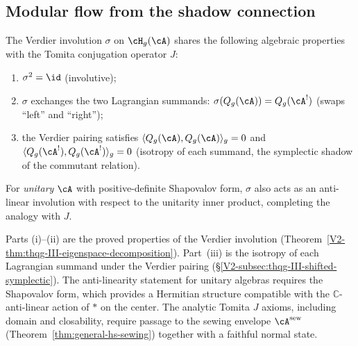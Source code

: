 \subsection{Modular flow from the shadow connection}
\label{subsec:thqg-entanglement-modular-flow}

\begin{conjecture}
\label{conj:thqg-tomita-from-verdier}
The Verdier involution $\sigma$ on $\cH_g(\cA)$
shares the following algebraic properties with the Tomita
conjugation operator $J$:
\begin{enumerate}[label=\textup{(\roman*)}]
\item $\sigma^2 = \id$ \textup{(}involutive\textup{)};
\item $\sigma$ exchanges the two Lagrangian summands:
 $\sigma(Q_g(\cA)) = Q_g(\cA^!)$ \textup{(}swaps ``left''
 and ``right''\textup{)};
\item the Verdier pairing satisfies
 $\langle Q_g(\cA), Q_g(\cA) \rangle_g = 0$ and
 $\langle Q_g(\cA^!), Q_g(\cA^!) \rangle_g = 0$
 \textup{(}isotropy of each summand, the symplectic shadow of
 the commutant relation\textup{)}.
\end{enumerate}
For \emph{unitary} $\cA$ with positive-definite Shapovalov form,
$\sigma$ also acts as an anti-linear involution
with respect to the unitarity inner product, completing the
analogy with $J$.
\end{conjecture}

\begin{remark}
Parts (i)--(ii) are the proved properties of the Verdier
involution
(Theorem~\ref{V2-thm:thqg-III-eigenspace-decomposition}).
Part~(iii) is the isotropy of each Lagrangian summand under
the Verdier pairing
(\S\ref{V2-subsec:thqg-III-shifted-symplectic}).
The anti-linearity statement for unitary algebras requires
the Shapovalov form, which provides a Hermitian structure
compatible with the $\mathbb{C}$-anti-linear action of $*$ on the
center.  The analytic Tomita $J$ axioms, including domain and
closability, require passage to the sewing envelope
$\cA^{\mathrm{sew}}$ (Theorem~\ref{thm:general-hs-sewing}) together
with a faithful normal state.
\end{remark}

